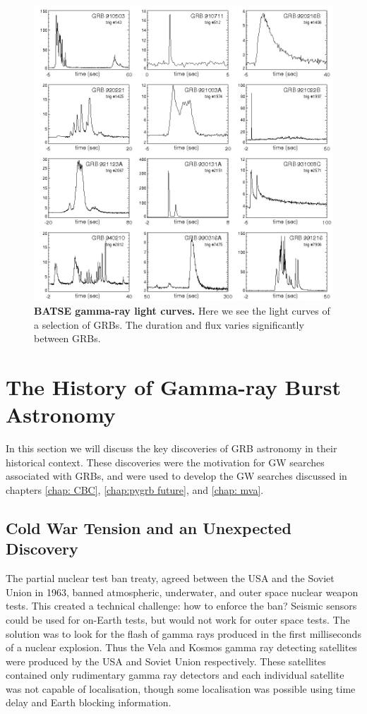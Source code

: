 \documentclass[11pt]{cuthesis}
\begin{document}
\begin{figure} %
\begin{center}
\includegraphics[width=1.0\linewidth]{grb_lightcurves.png}
\end{center}
\caption{\textbf{BATSE gamma-ray light curves.} Here we see the light curves of a selection of GRBs. The duration and flux varies significantly between GRBs. \cite{GRBprompt} } 
\label{fig:grb lightcurves}
\end{figure}

\section{The History of Gamma-ray Burst Astronomy} \label{sec:GRB history}
In this section we will discuss the key discoveries of GRB astronomy in their historical context. These discoveries were the motivation for GW searches associated with GRBs, and were used to develop the GW searches discussed in chapters \ref{chap: CBC}, \ref{chap:pygrb future}, and \ref{chap: mva}.  

\subsection{Cold War Tension and an Unexpected Discovery} \label{sec:cold war}
The partial nuclear test ban treaty, agreed between the USA and the Soviet Union in 1963, banned atmospheric, underwater, and outer space nuclear weapon tests. This created a technical challenge: how to enforce the ban? Seismic sensors could be used for on-Earth tests, but would not work for outer space tests. The solution was to look for the flash of gamma rays produced in the first milliseconds of a nuclear explosion. Thus the Vela and Kosmos gamma ray detecting satellites were produced by the USA and Soviet Union respectively. These satellites contained only rudimentary gamma ray detectors and each individual satellite was not capable of localisation, though some localisation was possible using time delay and Earth blocking information.
\end{document}
